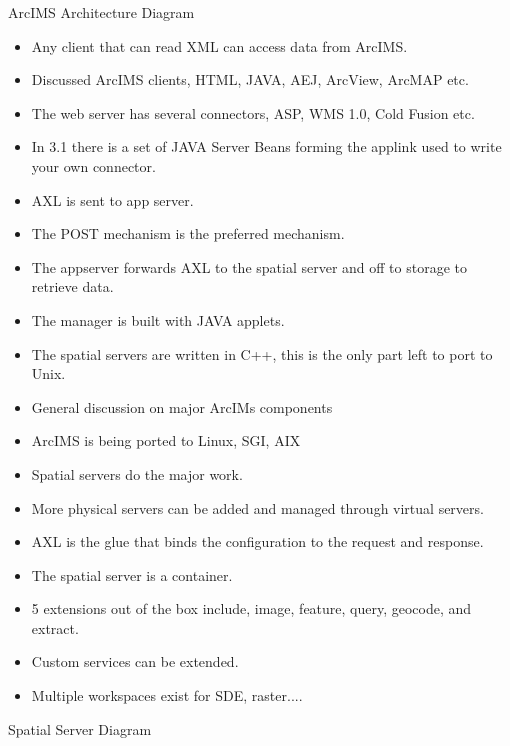 ArcIMS Architecture Diagram

\begin{itemize}
\item Any client that can read XML can access data from ArcIMS.
\item Discussed ArcIMS clients, HTML, JAVA, AEJ, ArcView, ArcMAP etc.
\item The web server has several connectors, ASP, WMS 1.0, Cold Fusion etc.
\item In 3.1 there is a set of JAVA Server Beans forming the applink used to write your own 
connector.
\item AXL is sent to app server.
\item The POST mechanism is the preferred mechanism.
\item The appserver forwards AXL to the spatial server and off to storage to retrieve data.
\item The manager is built with JAVA applets.
\item The spatial servers are written in C++,  this is the only part left to port to Unix.
\item General discussion on major ArcIMs components
\item ArcIMS is being ported to Linux, SGI, AIX
\item Spatial servers do the major work.
\item More physical servers can be added and managed through virtual servers.
\item AXL is the glue that binds the configuration to the request and response.
\item The spatial server is a container.
\item 5 extensions out of the box include, image, feature, query, geocode, and extract.
\item Custom services can be extended.
\item Multiple workspaces exist for SDE, raster....
\end{itemize}

Spatial Server Diagram

 


